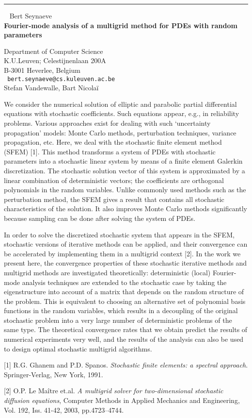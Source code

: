 \documentclass{report}
\begin{document}
\begin{center}

\rule{6in}{1pt} \
{\large
Bert Seynaeve
\\ {\bf
Fourier-mode analysis of a multigrid method for PDEs with random
parameters}
}

Department of Computer Science \\
K.U.Leuven; Celestijnenlaan 200A \\
B-3001 Heverlee, Belgium
\\ {\tt
bert.seynaeve@cs.kuleuven.ac.be
}
\\
Stefan Vandewalle,
Bart Nicola\"{i}
\end{center}

We consider the numerical solution of elliptic and parabolic partial
differential equations with stochastic coefficients. Such equations
appear, e.g., in reliability problems. Various approaches exist for
dealing with such `uncertainty propagation' models: Monte Carlo
methods, perturbation techniques, variance propagation, etc. Here, we
deal with the stochastic finite element method (SFEM) [1]. This method
transforms a system of PDEs with stochastic parameters into a
stochastic linear system by means of a finite element Galerkin
discretization. The stochastic solution vector of this system is
approximated by a linear combination of deterministic vectors; the
coefficients are orthogonal polynomials in the random variables. Unlike
commonly used methods such as the perturbation method, the SFEM gives a
result that contains all stochastic characteristics of the solution. It
also improves Monte Carlo methods significantly because sampling can be
done after solving the system of PDEs.

In order to solve the discretized stochastic system that appears in the
SFEM, stochastic versions of iterative methods can be applied, and
their convergence can be accelerated by implementing them in a
multigrid context [2]. In the work we present here, the convergence
properties of these stochastic iterative methods and multigrid methods
are investigated theoretically: deterministic (local) Fourier-mode
analysis techniques are extended to the stochastic case by taking the
eigenstructure into account of a matrix that depends on the random
structure of the problem. This is equivalent to choosing an alternative
set of polynomial basis functions in the random variables, which
results in a decoupling of the original stochastic problem into a very
large number of deterministic problems of the same type. The
theoretical convergence rates that we obtain predict the results of
numerical experiments very well, and the results of the analysis can
also be used to design optimal stochastic multigrid algorithms.

[1] R.G. Ghanem and P.D. Spanos.
{\em Stochastic finite elements: a
spectral approach}. Springer-Verlag, New York, 1991.

[2] O.P. Le Ma\^{i}tre et.al.
{\em A multigrid solver for
two-dimensional stochastic diffusion equations}, Computer Methods in
Applied Mechanics and Engineering, Vol. 192, Iss. 41-42, 2003,
pp.4723--4744.
\end{document}
